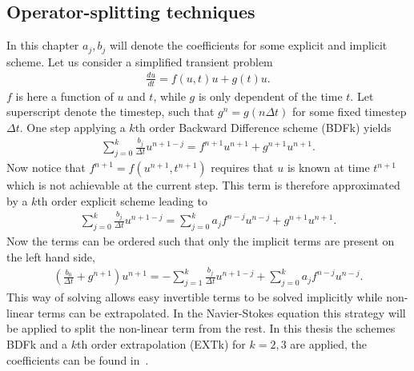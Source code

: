 \subsection{Operator-splitting techniques } \label{opsplitting}
In this chapter $a_j,b_j$ will denote the coefficients for some explicit and implicit scheme.
Let us consider a simplified transient problem 
\begin{align}
    \frac{du}{dt} = f(u,t)u + g(t)u.
    \label{eq:testproblem}
\end{align}
$f$ is here a function of $u$ and $t$, while $g$ is only dependent of the time $t$. Let superscript denote the timestep, 
such that $g^{n}=g(n\Delta t)$ for some fixed timestep $\Delta t$. One step applying a $k$th order
Backward Difference scheme (BDFk) yields
%
\begin{align}
    \sum_{j = 0}^{k} \frac{b_j}{\Delta t} u^{n+1-j} =f^{n+1}u^{n+1}+g^{n+1}u^{n+1}.
    \label{eq:imp}
\end{align}
%
Now notice that $f^{n+1}=f(u^{n+1},t^{n+1})$ requires that $u$ is known at time $t^{n+1}$ which is not achievable at the current 
step. This term is therefore approximated by a $k$th order explicit scheme leading to 
%
\begin{align}
    \sum_{j = 0}^{k} \frac{b_j}{\Delta t} u^{n+1-j} =\sum_{j = 0}^{k} a_j f^{n-j}u^{n-j}+g^{n+1}u^{n+1}.
    \label{eq:imp-exp}
\end{align}
%
Now the terms can be ordered such that only the implicit terms are present on the left hand side, 
%
\begin{align}
    (\frac{b_0}{\Delta t} +g^{n+1})u^{n+1} =-\sum_{j = 1}^{k} \frac{b_j}{\Delta t} u^{n+1-j}+\sum_{j = 0}^{k} a_j f^{n-j}u^{n-j}.
    \label{eq:imp-exp-ord}
\end{align}
%
This way of solving  allows easy invertible terms to be solved implicitly while non-linear terms can be extrapolated.
In the Navier-Stokes equation this strategy will be applied to split the non-linear term from the rest.
In this thesis the schemes BDFk and a $k$th order extrapolation (EXTk) for $k=2,3$ are applied, the coefficients can be found in~\cite{Nek}. 

